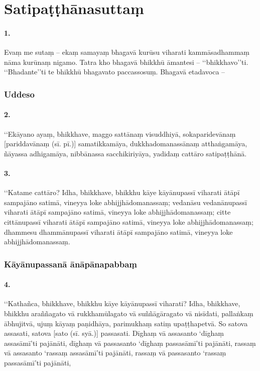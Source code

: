 \section{Satipaṭṭhānasuttaṃ}

\paragraph{1.} Evaṃ me sutaṃ – ekaṃ samayaṃ bhagavā kurūsu viharati kammāsadhammaṃ nāma kurūnaṃ nigamo. Tatra kho bhagavā bhikkhū āmantesi – ‘‘bhikkhavo’’ti. ‘‘Bhadante’’ti te bhikkhū bhagavato paccassosuṃ. Bhagavā etadavoca –

\subsubsection{Uddeso}

\paragraph{2.} ‘‘Ekāyano ayaṃ, bhikkhave, maggo sattānaṃ visuddhiyā, sokaparidevānaṃ [pariddavānaṃ (sī. pī.)] samatikkamāya, dukkhadomanassānaṃ atthaṅgamāya, ñāyassa adhigamāya, nibbānassa sacchikiriyāya, yadidaṃ cattāro satipaṭṭhānā.

\paragraph{3.} ‘‘Katame cattāro? Idha, bhikkhave, bhikkhu kāye kāyānupassī viharati ātāpī sampajāno satimā, vineyya loke abhijjhādomanassaṃ; vedanāsu vedanānupassī viharati ātāpī sampajāno satimā, vineyya loke abhijjhādomanassaṃ; citte cittānupassī viharati ātāpī sampajāno satimā, vineyya loke abhijjhādomanassaṃ; dhammesu dhammānupassī viharati ātāpī sampajāno satimā, vineyya loke abhijjhādomanassaṃ.


\subsubsection{Kāyānupassanā ānāpānapabbaṃ}

\paragraph{4.} ‘‘Kathañca, bhikkhave, bhikkhu kāye kāyānupassī viharati? Idha, bhikkhave, bhikkhu araññagato vā rukkhamūlagato vā suññāgāragato vā nisīdati, pallaṅkaṃ ābhujitvā, ujuṃ kāyaṃ paṇidhāya, parimukhaṃ satiṃ upaṭṭhapetvā. So satova assasati, satova [sato (sī. syā.)] passasati. Dīghaṃ vā assasanto ‘dīghaṃ assasāmī’ti pajānāti, dīghaṃ vā passasanto ‘dīghaṃ passasāmī’ti pajānāti, rassaṃ vā assasanto ‘rassaṃ assasāmī’ti pajānāti, rassaṃ vā passasanto ‘rassaṃ passasāmī’ti pajānāti,

